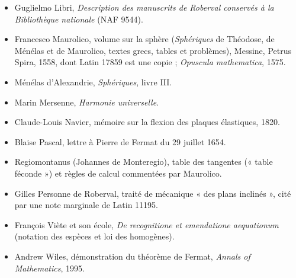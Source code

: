 \documentclass[11pt,a4paper]{article}
\begin{document}
\begin{itemize}
  (désignation « manuscrit C »).
\item Guglielmo Libri, \emph{Description des manuscrits de Roberval conservés à la
  Bibliothèque nationale} (NAF 9544).
\item Francesco Maurolico, volume sur la sphère (\emph{Sphériques} de Théodose, de
  Ménélas et de Maurolico, textes grecs, tables et problèmes), Messine, Petrus
  Spira, 1558, dont Latin 17859 est une copie ; \emph{Opuscula mathematica}, 1575.
\item Ménélas d'Alexandrie, \emph{Sphériques}, livre III.
\item Marin Mersenne, \emph{Harmonie universelle}.
\item Claude-Louis Navier, mémoire sur la flexion des plaques élastiques, 1820.
\item Blaise Pascal, lettre à Pierre de Fermat du 29 juillet 1654.
\item Regiomontanus (Johannes de Monteregio), table des tangentes (« table
  féconde ») et règles de calcul commentées par Maurolico.
\item Gilles Personne de Roberval, traité de mécanique « des plans inclinés », cité par
  une note marginale de Latin 11195.
\item François Viète et son école, \emph{De recognitione et emendatione
  aequationum} (notation des espèces et loi des homogènes).
\item Andrew Wiles, démonstration du théorème de Fermat, \emph{Annals of
  Mathematics}, 1995.
\end{itemize}
\end{document}
